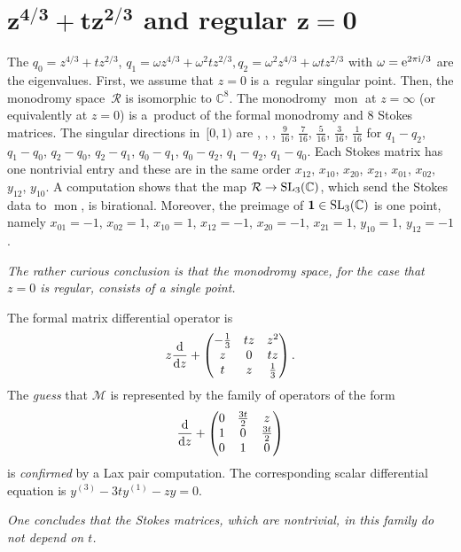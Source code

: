 \documentclass[pdftex]{sigma}
\numberwithin{equation}{section}
\begin{document}
\section[z-power(4/3)+t*z-power(2/3) and regular z=0]{$\boldsymbol{z^{4/3}+tz^{2/3}}$ and regular $\boldsymbol{z=0}$}\label{three}
The $q_0=z^{4/3}+tz^{2/3}$, $q_1=\omega z^{4/3}+\omega ^2tz^{2/3},
q_2=\omega^2z^{4/3}+\omega tz^{2/3}$ with $\omega={\rm e}^{2\pi {\rm i} /3}$ are the eigenvalues. First, we assume that $z=0$ is a~regular singular point. Then, the monodromy
space~$\mathcal{R}$ is isomorphic to $\mathbb{C}^8$. The monodromy $\operatorname{mon}$ at $z=\infty$ (or equivalently at $z=0$) is a~product of the formal monodromy and 8 Stokes matrices. The singular directions in~$[0,1)$ are
, , , $\frac{9}{16}$, $\frac{7}{16}$, $\frac{5}{16}$, $\frac{3}{16}$, $\frac{1}{16}$
for $q_1-q_2$, $q_1-q_0$, $q_2-q_0$, $q_2-q_1$, $q_0-q_1$, $q_0-q_2$, $q_1-q_2$, $q_1-q_0$.
Each Stokes matrix has one nontrivial entry and these are in the same order
$x_{12}$, $x_{10}$, $x_{20}$, $x_{21}$, $x_{01}$, $x_{02}$, $y_{12}$, $y_{10}$.
A computation shows that the map $\mathcal{R}\rightarrow {\rm SL}_3(\mathbb{C})$, which send the Stokes data to $\operatorname{mon}$,
is birational. Moreover, the preimage of ${\bf 1} \in {\rm SL}_3(\mathbb{C})$ is one point, namely
$x_{01} = -1$, $ x_{02} = 1$, $ x_{10} = 1$, $ x_{12} = -1$, $ x_{20} = -1$, $ x_{21} = 1$, $ y_{10} = 1$, $ y_{12} = -1$.

 {\it The rather curious conclusion is that the monodromy space, for the case that $z=0$ is regular, consists of a single point.}

The formal matrix differential operator is
\[
z\frac{{\rm d}}{{\rm d}z}+ \begin{pmatrix} -\frac{1}{3} &tz &z^2 \\ z&0 & tz \\ t& z& \frac{1}{3} \end{pmatrix}.\]
The {\it guess} that $\mathcal{M}$ is represented by the family of operators of the form
\[\frac{{\rm d}}{{\rm d}z}+ {\begin{pmatrix} 0 &\frac{3t}{2} &z \\ 1&0 & \frac{3t}{2} \\ 0& 1& 0 \end{pmatrix}}
\]
is {\it confirmed} by a Lax pair computation. The corresponding scalar differential equation is $y^{(3)}-3ty^{(1)}-zy=0$.

 {\it One concludes that the Stokes
matrices, which are nontrivial, in this family do not depend on $t$.}
\end{document}
